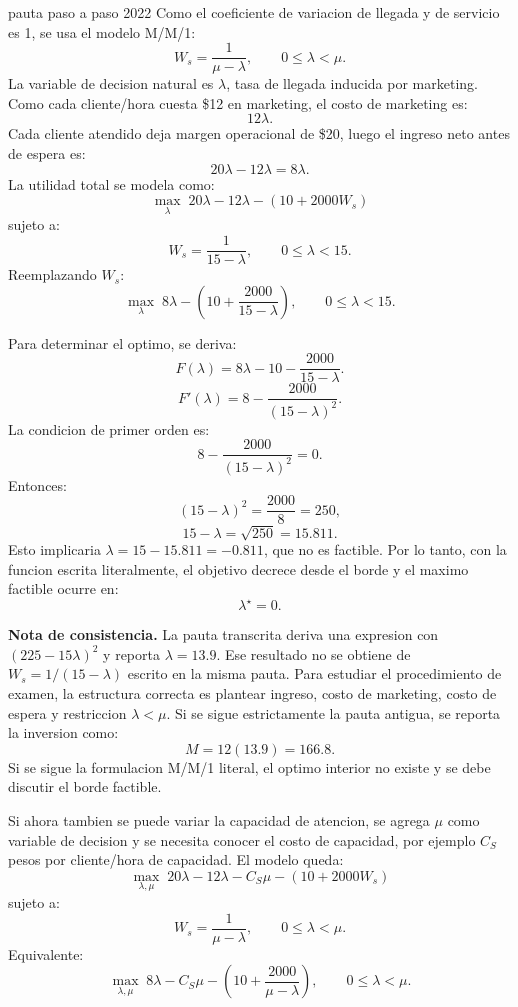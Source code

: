 \begin{pautacompleta}{pauta paso a paso 2022}
Como el coeficiente de variacion de llegada y de servicio es 1, se usa el modelo M/M/1:
\[
  W_s=\frac{1}{\mu-\lambda},
  \qquad
  0\leq \lambda<\mu.
\]
La variable de decision natural es $\lambda$, tasa de llegada inducida por marketing. Como cada cliente/hora cuesta \$12 en marketing, el costo de marketing es:
\[
  12\lambda.
\]
Cada cliente atendido deja margen operacional de \$20, luego el ingreso neto antes de espera es:
\[
  20\lambda-12\lambda=8\lambda.
\]
La utilidad total se modela como:
\[
  \max_\lambda\; 20\lambda-12\lambda-\left(10+2000W_s\right)
\]
sujeto a:
\[
  W_s=\frac{1}{15-\lambda},
  \qquad
  0\leq \lambda<15.
\]
Reemplazando $W_s$:
\[
  \max_\lambda\; 8\lambda-\left(10+\frac{2000}{15-\lambda}\right),
  \qquad
  0\leq \lambda<15.
\]

Para determinar el optimo, se deriva:
\[
  F(\lambda)=8\lambda-10-\frac{2000}{15-\lambda}.
\]
\[
  F'(\lambda)=8-\frac{2000}{(15-\lambda)^2}.
\]
La condicion de primer orden es:
\[
  8-\frac{2000}{(15-\lambda)^2}=0.
\]
Entonces:
\[
  (15-\lambda)^2=\frac{2000}{8}=250,
\]
\[
  15-\lambda=\sqrt{250}=15.811.
\]
Esto implicaria $\lambda=15-15.811=-0.811$, que no es factible. Por lo tanto, con la funcion escrita literalmente, el objetivo decrece desde el borde y el maximo factible ocurre en:
\[
  \lambda^\star=0.
\]

\textbf{Nota de consistencia.} La pauta transcrita deriva una expresion con $(225-15\lambda)^2$ y reporta $\lambda=13.9$. Ese resultado no se obtiene de $W_s=1/(15-\lambda)$ escrito en la misma pauta. Para estudiar el procedimiento de examen, la estructura correcta es plantear ingreso, costo de marketing, costo de espera y restriccion $\lambda<\mu$. Si se sigue estrictamente la pauta antigua, se reporta la inversion como:
\[
  M=12(13.9)=166.8.
\]
Si se sigue la formulacion M/M/1 literal, el optimo interior no existe y se debe discutir el borde factible.

Si ahora tambien se puede variar la capacidad de atencion, se agrega $\mu$ como variable de decision y se necesita conocer el costo de capacidad, por ejemplo $C_S$ pesos por cliente/hora de capacidad. El modelo queda:
\[
  \max_{\lambda,\mu}\;20\lambda-12\lambda-C_S\mu-\left(10+2000W_s\right)
\]
sujeto a:
\[
  W_s=\frac{1}{\mu-\lambda},
  \qquad
  0\leq \lambda<\mu.
\]
Equivalente:
\[
  \max_{\lambda,\mu}\;8\lambda-C_S\mu-\left(10+\frac{2000}{\mu-\lambda}\right),
  \qquad
  0\leq \lambda<\mu.
\]
\end{pautacompleta}

